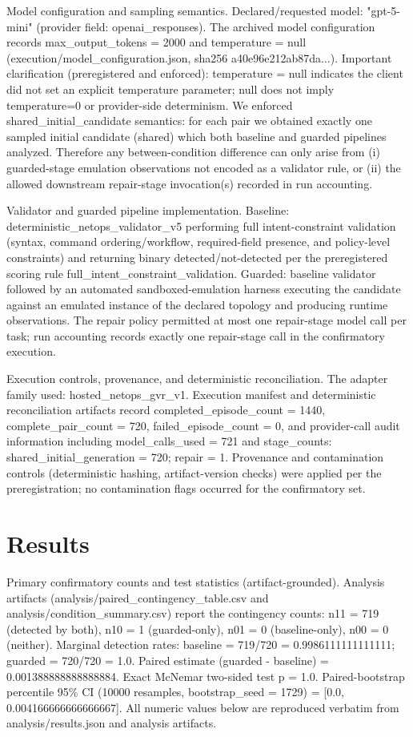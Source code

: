 \documentclass[conference]{IEEEtran}
\begin{document}
Model configuration and sampling semantics. Declared/requested model: "gpt-5-mini" (provider field: openai\_responses). The archived model configuration records max\_output\_tokens = 2000 and temperature = null (execution/model\_configuration.json, sha256 a40e96e212ab87da...). Important clarification (preregistered and enforced): temperature = null indicates the client did not set an explicit temperature parameter; null does not imply temperature=0 or provider-side determinism. We enforced shared\_initial\_candidate semantics: for each pair we obtained exactly one sampled initial candidate (shared) which both baseline and guarded pipelines analyzed. Therefore any between-condition difference can only arise from (i) guarded-stage emulation observations not encoded as a validator rule, or (ii) the allowed downstream repair-stage invocation(s) recorded in run accounting.

Validator and guarded pipeline implementation. Baseline: deterministic\_netops\_validator\_v5 performing full intent-constraint validation (syntax, command ordering/workflow, required-field presence, and policy-level constraints) and returning binary detected/not-detected per the preregistered scoring rule full\_intent\_constraint\_validation. Guarded: baseline validator followed by an automated sandboxed-emulation harness executing the candidate against an emulated instance of the declared topology and producing runtime observations. The repair policy permitted at most one repair-stage model call per task; run accounting records exactly one repair-stage call in the confirmatory execution.

Execution controls, provenance, and deterministic reconciliation. The adapter family used: hosted\_netops\_gvr\_v1. Execution manifest and deterministic reconciliation artifacts record completed\_episode\_count = 1440, complete\_pair\_count = 720, failed\_episode\_count = 0, and provider-call audit information including model\_calls\_used = 721 and stage\_counts: shared\_initial\_generation = 720; repair = 1. Provenance and contamination controls (deterministic hashing, artifact-version checks) were applied per the preregistration; no contamination flags occurred for the confirmatory set.

\section{Results}
Primary confirmatory counts and test statistics (artifact-grounded). Analysis artifacts (analysis/paired\_contingency\_table.csv and analysis/condition\_summary.csv) report the contingency counts: n11 = 719 (detected by both), n10 = 1 (guarded-only), n01 = 0 (baseline-only), n00 = 0 (neither). Marginal detection rates: baseline = 719/720 = 0.9986111111111111; guarded = 720/720 = 1.0. Paired estimate (guarded - baseline) = 0.001388888888888884. Exact McNemar two-sided test p = 1.0. Paired-bootstrap percentile 95\% CI (10000 resamples, bootstrap\_seed = 1729) = [0.0, 0.004166666666666667]. All numeric values below are reproduced verbatim from analysis/results.json and analysis artifacts.
\end{document}
